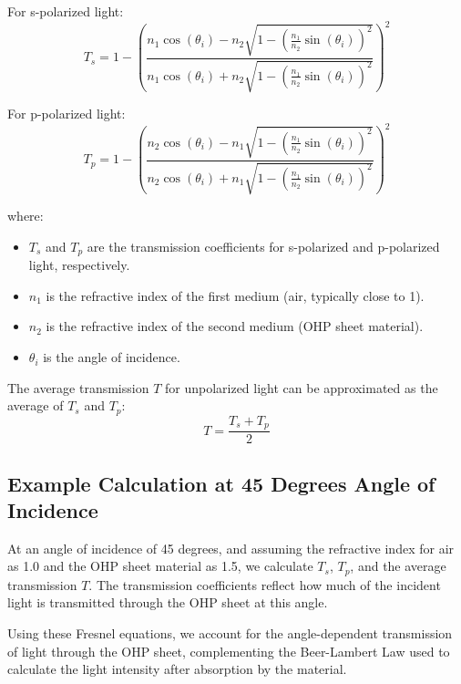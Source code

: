 For s-polarized light:
\[ T_s = 1 - \left( \frac{n_1 \cos(\theta_i) - n_2 \sqrt{1 - \left(\frac{n_1}{n_2} \sin(\theta_i)\right)^2}}{n_1 \cos(\theta_i) + n_2 \sqrt{1 - \left(\frac{n_1}{n_2} \sin(\theta_i)\right)^2}} \right)^2 \]

For p-polarized light:
\[ T_p = 1 - \left( \frac{n_2 \cos(\theta_i) - n_1 \sqrt{1 - \left(\frac{n_1}{n_2} \sin(\theta_i)\right)^2}}{n_2 \cos(\theta_i) + n_1 \sqrt{1 - \left(\frac{n_1}{n_2} \sin(\theta_i)\right)^2}} \right)^2 \]

where:
\begin{itemize}
    \item \( T_s \) and \( T_p \) are the transmission coefficients for s-polarized and p-polarized light, respectively.
    \item \( n_1 \) is the refractive index of the first medium (air, typically close to 1).
    \item \( n_2 \) is the refractive index of the second medium (OHP sheet material).
    \item \( \theta_i \) is the angle of incidence.
\end{itemize}

The average transmission \( T \) for unpolarized light can be approximated as the average of \( T_s \) and \( T_p \):
\[ T = \frac{T_s + T_p}{2} \]

\subsection*{Example Calculation at 45 Degrees Angle of Incidence}
At an angle of incidence of 45 degrees, and assuming the refractive index for air as 1.0 and the OHP sheet material as 1.5, we calculate \( T_s \), \( T_p \), and the average transmission \( T \). The transmission coefficients reflect how much of the incident light is transmitted through the OHP sheet at this angle.

Using these Fresnel equations, we account for the angle-dependent transmission of light through the OHP sheet, complementing the Beer-Lambert Law used to calculate the light intensity after absorption by the material.

